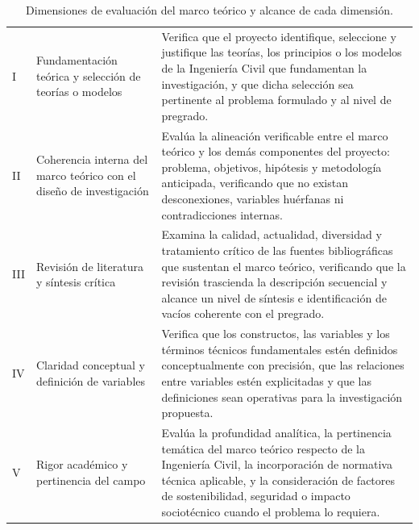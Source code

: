 \begin{table}[htbp]
\centering
\scriptsize
\caption{Dimensiones de evaluación del marco teórico y alcance de cada dimensión.}
\label{tab:dim-marco-teorico}
\begin{tabularx}{\textwidth}{|C{0.8cm}|L{4.5cm}|X|}
\hline
{}
 &  &  \\ \hline
I & Fundamentación teórica y selección de teorías o modelos & Verifica que el proyecto identifique, seleccione y justifique las teorías, los principios o los modelos de la Ingeniería Civil que fundamentan la investigación, y que dicha selección sea pertinente al problema formulado y al nivel de pregrado. \\ \hline
{}
II & Coherencia interna del marco teórico con el diseño de investigación & Evalúa la alineación verificable entre el marco teórico y los demás componentes del proyecto: problema, objetivos, hipótesis y metodología anticipada, verificando que no existan desconexiones, variables huérfanas ni contradicciones internas. \\ \hline
III & Revisión de literatura y síntesis crítica & Examina la calidad, actualidad, diversidad y tratamiento crítico de las fuentes bibliográficas que sustentan el marco teórico, verificando que la revisión trascienda la descripción secuencial y alcance un nivel de síntesis e identificación de vacíos coherente con el pregrado. \\ \hline
{}
IV & Claridad conceptual y definición de variables & Verifica que los constructos, las variables y los términos técnicos fundamentales estén definidos conceptualmente con precisión, que las relaciones entre variables estén explicitadas y que las definiciones sean operativas para la investigación propuesta. \\ \hline
V & Rigor académico y pertinencia del campo & Evalúa la profundidad analítica, la pertinencia temática del marco teórico respecto de la Ingeniería Civil, la incorporación de normativa técnica aplicable, y la consideración de factores de sostenibilidad, seguridad o impacto sociotécnico cuando el problema lo requiera. \\ \hline
\end{tabularx}
\end{table}
